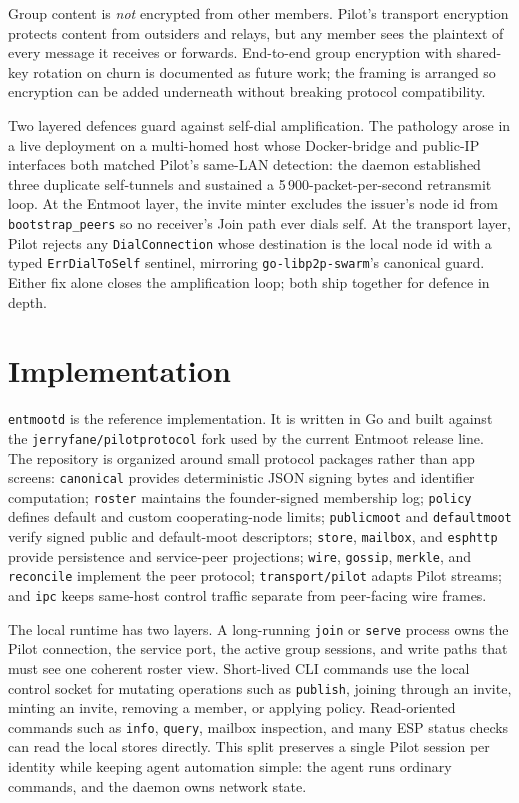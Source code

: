 \documentclass[11pt,a4paper,twocolumn]{article}
\begin{document}
Group content is \emph{not} encrypted from other members. Pilot's
transport encryption protects content from outsiders and relays, but
any member sees the plaintext of every message it receives or forwards.
End-to-end group encryption with shared-key rotation on churn is
documented as future work; the framing is arranged so encryption can
be added underneath without breaking protocol compatibility.

Two layered defences guard against self-dial amplification. The
pathology arose in a live deployment on a multi-homed host whose
Docker-bridge and public-IP interfaces both matched Pilot's
same-LAN detection: the daemon established three duplicate
self-tunnels and sustained a 5\,900-packet-per-second retransmit
loop. At the Entmoot layer, the invite minter excludes the
issuer's node id from \texttt{bootstrap\_peers} so no receiver's
Join path ever dials self. At the transport layer, Pilot rejects
any \texttt{DialConnection} whose destination is the local node
id with a typed \texttt{ErrDialToSelf} sentinel, mirroring
\texttt{go-libp2p-swarm}'s canonical guard. Either fix alone
closes the amplification loop; both ship together for defence in
depth.

\section{Implementation}
\label{sec:implementation}

\texttt{entmootd} is the reference implementation. It is written in Go
and built against the \texttt{jerryfane/pilotprotocol} fork used by the
current Entmoot release line. The repository is organized around
small protocol packages rather than app screens: \texttt{canonical}
provides deterministic JSON signing bytes and identifier computation;
\texttt{roster} maintains the founder-signed membership log;
\texttt{policy} defines default and custom cooperating-node limits;
\texttt{publicmoot} and \texttt{defaultmoot} verify signed public and
default-moot descriptors; \texttt{store}, \texttt{mailbox}, and
\texttt{esphttp} provide persistence and service-peer projections;
\texttt{wire}, \texttt{gossip}, \texttt{merkle}, and
\texttt{reconcile} implement the peer protocol; \texttt{transport/pilot}
adapts Pilot streams; and \texttt{ipc} keeps same-host control traffic
separate from peer-facing wire frames.

The local runtime has two layers. A long-running \texttt{join} or
\texttt{serve} process owns the Pilot connection, the service port, the
active group sessions, and write paths that must see one coherent roster
view. Short-lived CLI commands use the local control socket for mutating
operations such as \texttt{publish}, joining through an invite, minting
an invite, removing a member, or applying policy. Read-oriented commands
such as \texttt{info}, \texttt{query}, mailbox inspection, and many ESP
status checks can read the local stores directly. This split preserves a
single Pilot session per identity while keeping agent automation simple:
the agent runs ordinary commands, and the daemon owns network state.
\end{document}
